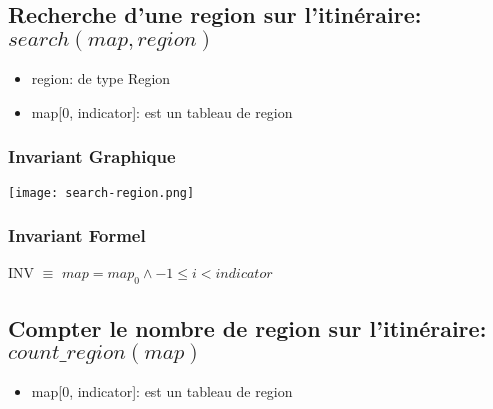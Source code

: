 
\subsection{Recherche d'une region sur l'itinéraire: $search(map, region)$}

\begin{itemize}
    \item region: de type Region
    \item map[0, indicator]: est un tableau de region
\end{itemize}

\subsubsection{Invariant Graphique}

\addvspace{40px}
\begin{center}
    \texttt{[image: search-region.png]}
\end{center}
\addvspace{40px}

\subsubsection{Invariant Formel}

INV $\equiv$ $map=map_0 \land -1 \le i < indicator$



\subsection{Compter le nombre de region sur l'itinéraire: $count\_region(map)$}

\begin{itemize}
    \item map[0, indicator]: est un tableau de region
\end{itemize}


